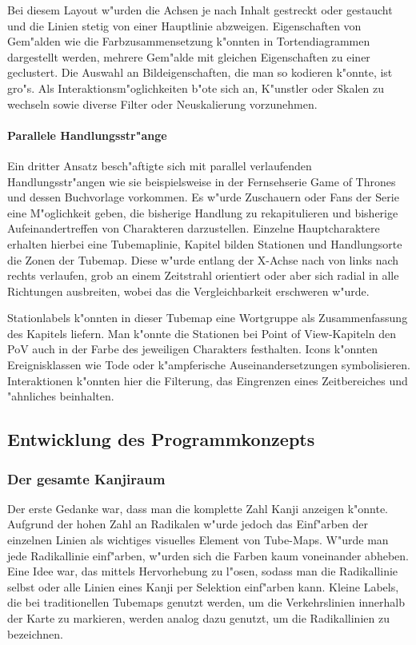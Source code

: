 Bei diesem Layout w"urden die Achsen je nach Inhalt gestreckt oder gestaucht und die Linien stetig von einer Hauptlinie abzweigen. Eigenschaften von Gem"alden wie die Farbzusammensetzung k"onnten in Tortendiagrammen dargestellt werden, mehrere Gem"alde mit gleichen Eigenschaften zu einer geclustert. Die Auswahl an Bildeigenschaften, die man so kodieren k"onnte, ist gro"s. Als Interaktionsm"oglichkeiten b"ote sich an, K"unstler oder Skalen zu wechseln sowie diverse Filter oder Neuskalierung vorzunehmen. 

\paragraph{Parallele Handlungsstr"ange}
Ein dritter Ansatz besch"aftigte sich mit parallel verlaufenden Handlungsstr"angen wie sie beispielsweise in der Fernsehserie Game of Thrones und dessen Buchvorlage vorkommen. Es w"urde Zuschauern oder Fans der Serie eine M"oglichkeit geben, die bisherige Handlung zu rekapitulieren und bisherige Aufeinandertreffen von Charakteren darzustellen. Einzelne Hauptcharaktere erhalten hierbei eine Tubemaplinie, Kapitel bilden Stationen und Handlungsorte die Zonen der Tubemap. Diese w"urde entlang der X-Achse nach von links nach rechts verlaufen, grob an einem Zeitstrahl orientiert oder aber sich radial in alle Richtungen ausbreiten, wobei das die Vergleichbarkeit erschweren w"urde.

Stationlabels k"onnten in dieser Tubemap eine Wortgruppe als Zusammenfassung des Kapitels liefern. Man k"onnte die Stationen bei Point of View-Kapiteln den PoV auch in der Farbe des jeweiligen Charakters festhalten. Icons k"onnten Ereignisklassen wie Tode oder k"ampferische Auseinandersetzungen symbolisieren. Interaktionen k"onnten hier die Filterung, das Eingrenzen eines Zeitbereiches und "ahnliches beinhalten. 


\subsection{Entwicklung des Programmkonzepts}
\subsubsection{Der gesamte Kanjiraum}
Der erste Gedanke war, dass man die komplette Zahl Kanji anzeigen k"onnte. Aufgrund der hohen Zahl an Radikalen w"urde jedoch das Einf"arben der einzelnen Linien als wichtiges visuelles Element von Tube-Maps. W"urde man jede Radikallinie einf"arben, w"urden sich die Farben kaum voneinander abheben. Eine Idee war, das mittels Hervorhebung zu l"osen, sodass man die Radikallinie selbst oder alle Linien eines Kanji per Selektion einf"arben kann. Kleine Labels, die bei traditionellen Tubemaps genutzt werden, um die Verkehrslinien innerhalb der Karte zu markieren, werden analog dazu genutzt, um die Radikallinien zu bezeichnen.

